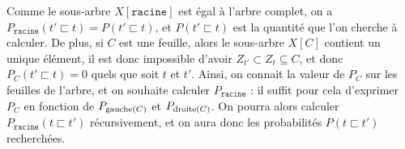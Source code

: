 
Comme le sous-arbre $X[\texttt{racine}]$ est égal à l'arbre complet, on a $P_\texttt{racine}(t' \sqsubset t) = P(t' \sqsubset t)$, et $P(t' \sqsubset t)$ est la quantité que l'on cherche à calculer. De plus, si $C$ est une feuille, alors le sous-arbre $X[C]$ contient un unique élément, il est donc impossible d'avoir $Z_{t'} \subset Z_{t} \subseteq C$, et donc $P_C(t' \sqsubset t) = 0$ quels que soit $t$ et $t'$. 
Ainsi, on connait la valeur de $P_C$ sur les feuilles de l'arbre, et on souhaite calculer $P_\texttt{racine}$ : il suffit pour cela d'exprimer $P_C$ en fonction de $P_{\operatorname{gauche}(C)}$ et $P_{\operatorname{droite}(C)}$. On pourra alors calculer $P_\texttt{racine}(t \sqsubset t')$ récursivement, et on aura donc les probabilités $P(t \sqsubset t')$ recherchées.

